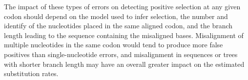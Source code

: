 

The impact of these types of errors on detecting positive selection at
any given codon should depend on the model used to infer selection,
the number and identify of the \nhom nucleotides placed in the same
aligned codon, and the branch length leading to the sequence
containing the misaligned bases. Misalignment of multiple nucleotides
in the same codon would tend to produce more false positives than
single-nucleotide errors, and misalignment in sequences or trees with
shorter branch length may have an overall greater impact on the
estimated \nsyn substitution rates.

